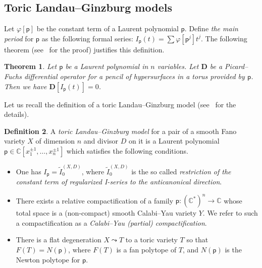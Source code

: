 \documentclass[10pt]{amsart}
\numberwithin{equation}{section}
\theoremstyle{plain}
\newtheorem{theorem}{Theorem}[section]
\theoremstyle{definition}
\newtheorem{definition}[theorem]{Definition}
\theoremstyle{remark}
\begin{document}
\subsection{Toric Landau--Ginzburg models}\label{subsection:LG-models}

Let \(\varphi[\mathsf{p}]\) be the constant term of a Laurent polynomial \(\mathsf{p}\). Define \emph{the main period} for \(\mathsf{p}\) as the following formal series: \(I_{\mathsf{p}}(t) = \sum \varphi[\mathsf{p}^j] t^j\). The following theorem (see~\cite[Proposition~2.3]{przyjalkowski2013weak} for the proof) justifies this definition.

\begin{theorem}
  Let \(\mathsf{p}\) be a Laurent polynomial in \(n\) variables. Let \(\mathbf {D}\) be a Picard--Fuchs differential operator for a pencil of hypersurfaces in a torus provided by \(\mathsf{p}\). Then we have \(\mathbf{D}[I_{\mathsf{p}}(t)] = 0\).
\end{theorem}

Let us recall the definition of a toric Landau--Ginzburg model (see~\cite[2.1]{przyjalkowski2018review} for the details).

\begin{definition}
  A \emph{toric Landau--Ginzburg model} for a pair of a smooth Fano variety \(X\) of dimension \(n\) and divisor \(D\) on it is a Laurent polynomial \(\mathsf{p} \in \mathbb{C}[x_1^{\pm 1}, \ldots, x_n^{\pm 1}]\) which satisfies the following conditions.
  \begin{itemize}
  \item[\textbf{Period condition:}] One has \(I_{\mathsf{p}} = \widetilde{I}_0^{(X, D)}\), where \(\widetilde{I}_0^{(X, D)}\) is the so called \emph{restriction of the constant term of regularized I-series to the anticanonical direction}.
  \item[\textbf{Calabi--Yau condition:}] There exists a relative compactification of a family \(\mathsf{p} \colon (\mathbb{C}^*)^n \rightarrow \mathbb{C}\) whose total space is a (non-compact) smooth Calabi--Yau variety \(Y\). We refer to such a compactification as a \emph{Calabi--Yau (partial) compactification}.
  \item[\textbf{Toric condition:}] There is a flat degeneration \(X \leadsto T\) to a toric variety \(T\) so that \(F(T) = N(\mathsf{p})\), where \(F(T)\) is a fan polytope of \(T\), and \(N(\mathsf{p})\) is the Newton polytope for \(\mathsf{p}\).
  \end{itemize}
\end{definition}
\end{document}
